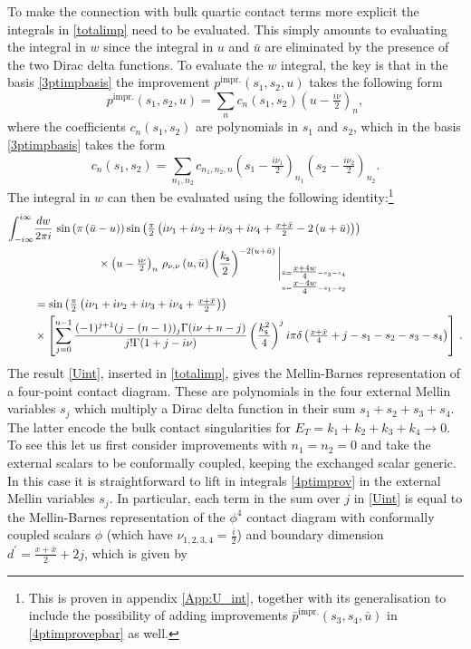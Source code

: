 \documentclass[11pt,a4paper]{article}
\begin{document}
To make the connection with bulk quartic contact terms more explicit the integrals in \eqref{totalimp} need to be evaluated. This simply amounts to evaluating the integral in $w$ since the integral in $u$ and ${\bar u}$ are eliminated by the presence of the two Dirac delta functions. To evaluate the $w$ integral, the key is that in the basis \eqref{3ptimpbasis} the improvement $p^{\text{impr.}}\left(s_1,s_2,u\right)$ takes the following form
\begin{equation}\label{impansatz}
    p^{\text{impr.}}\left(s_1,s_2,u\right) = \sum_{n}c_{n}\left(s_1,s_2\right)\left(u-\tfrac{i\nu}{2}\right)_n,
\end{equation}
where the coefficients $c_{n}\left(s_1,s_2\right)$ are polynomials in $s_1$ and $s_2$, which in the basis \eqref{3ptimpbasis} takes the form
\begin{equation}
    c_{n}\left(s_1,s_2\right) = \sum\limits_{n_1,n_2} c_{n_1,n_2,n}\left(s_1-\tfrac{i\nu_1}{2}\right)_{n_1}\left(s_2-\tfrac{i\nu_2}{2}\right)_{n_2}.
\end{equation}
The integral in $w$ can then be evaluated using the following identity:\footnote{This is proven in appendix \ref{App:U_int}, together with its generalisation to include the possibility of adding improvements ${\bar p}^{\text{impr.}}\left(s_3,s_4,{\bar u}\right)$ in \eqref{4ptimprovepbar} as well.}
\begin{align}\label{Uint}
\int^{i\infty}_{-i\infty} & \frac{dw}{2\pi i}\,\sin \left(\pi \left({\bar u}-u\right)\right)\sin \left(\tfrac{\pi}{2}  \left(i \nu_1+i \nu_2+i \nu_3+i \nu_4+\tfrac{x+{\bar x}}{2}-2\left(u+{\bar u}\right)\right)\right)\\ \nonumber
& \hspace*{2cm}\times \left(u-\tfrac{i\nu}{2}\right)_n\,\rho_{\nu,\nu}\left(u,{\bar u}\right)\left(\frac{k_{\sf s}}{2}\right)^{-2\left(u+{\bar u}\right)}\Bigg|_{{}^{{\bar u}=\tfrac{x+4w}{4}-s_3-s_4}_{u=\tfrac{x-4w}{4}-s_1-s_2}} \\\nonumber&=  \sin \left(\tfrac{\pi}{2}  \left(i \nu_1+i \nu_2+i \nu_3+i \nu_4+\tfrac{x+{\bar x}}{2}\right)\right)\\
&\times \left[\sum_{j=0}^{n-1}\frac{(-1)^{j+1}  (j-(n-1))_j \Gamma (i\nu+n-j )}{j! \Gamma (1+j-i \nu )}\left(\frac{k^2_{\sf s}}{4}\right)^{j}i\pi \delta\left(\tfrac{x+\bar{x}}4+j-s_1-s_2-s_3-s_4\right)\right]\,.\nonumber
\end{align}
The result \eqref{Uint}, inserted in \eqref{totalimp}, gives the Mellin-Barnes representation of a four-point contact diagram. These are polynomials in the four external Mellin variables $s_j$ which multiply a Dirac delta function in their sum $s_1+s_2+s_3+s_4$. The latter encode the bulk contact singularities for $E_T = k_1+k_2+k_3+k_4 \to 0$. To see this let us first consider improvements with $n_1=n_2=0$ and take the external scalars to be conformally coupled, keeping the exchanged scalar generic. In this case it is straightforward to lift in integrals \eqref{4ptimprov} in the external Mellin variables $s_j$. In particular, each term in the sum over $j$ in \eqref{Uint} is equal to the Mellin-Barnes representation of the $\phi^4$ contact diagram with conformally coupled scalars $\phi$ (which have $\nu_{1,2,3,4}=\tfrac{i}{2}$) and boundary dimension $d^\prime=\tfrac{x+{\bar x}}{2}+2j$, which is given by
\end{document}
